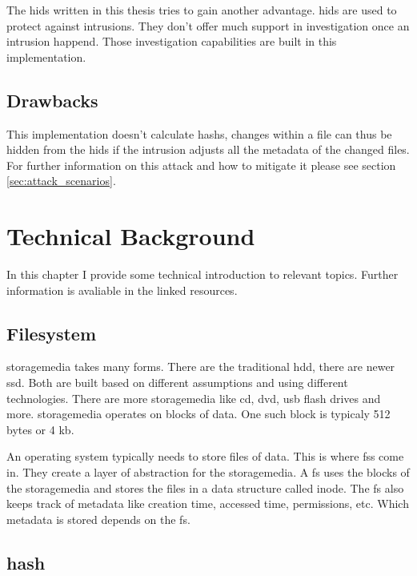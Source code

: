 \documentclass[
	a4paper,					%
	10pt,							%
	twoside,					%
	openright,				%
	notitlepage,			%
	parskip=half,			%
]{scrreprt}					%
\begin{document}
The \gls{hids} written in this thesis tries to gain another advantage. \gls{hids} are used to protect against \glspl{intrusion}. They don't offer much support in \gls{investigation} once an \gls{intrusion} happend. Those \gls{investigation} capabilities are built in this implementation. 

\section{Drawbacks}

This implementation doesn't calculate \glspl{hash}, changes within a file can thus be hidden from the \gls{hids} if the intrusion adjusts all the \gls{metadata} of the changed files. For further information on this attack and how to mitigate it please see section \ref{sec:attack_scenarios}.

\chapter{Technical Background}

In this chapter I provide some technical introduction to relevant topics. Further information is avaliable in the linked resources.

\section{Filesystem}
\label{sec:fs}

\gls{storagemedia} takes many forms. There are the traditional \gls{hdd}, there are newer \gls{ssd}. Both are built based on different assumptions and using different technologies. There are more \gls{storagemedia} like \gls{cd}, \gls{dvd}, \gls{usb} flash drives and more. \gls{storagemedia} operates on blocks of data. One such block is typicaly 512 bytes or 4 \gls{kb}. \cite{bruce:imaging}

An operating system typically needs to store files of data. This is where \glspl{fs} come in. They create a layer of abstraction for the \gls{storagemedia}. A \gls{fs} uses the blocks of the \gls{storagemedia} and stores the files in a data structure called inode. \cite{inode} The \gls{fs} also keeps track of \gls{metadata} like creation time, accessed time, permissions, etc. Which \gls{metadata} is stored depends on the \gls{fs}. \cite{bruce:imaging}

\section{\gls{hash}}
\label{sec:hashing}
\end{document}
